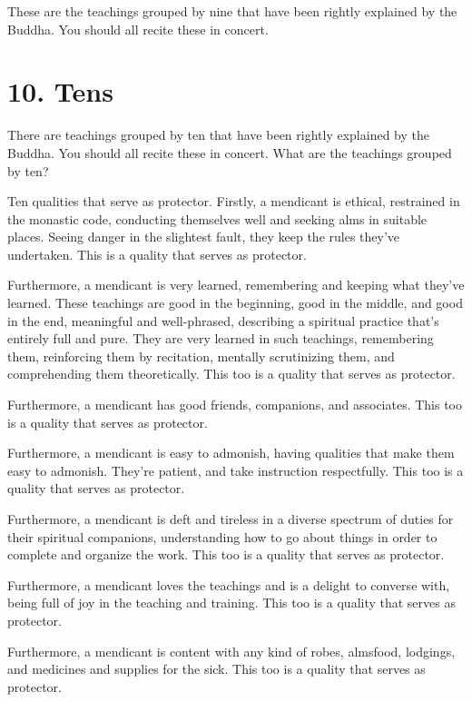 \documentclass[12pt,openany]{book}%
\begin{document}
These are the teachings grouped by nine that have been rightly explained by the Buddha. You should all recite these in concert. 

\section*{10. Tens }

There are teachings grouped by ten that have been rightly explained by the Buddha. You should all recite these in concert. What are the teachings grouped by ten? 

Ten qualities that serve as protector. Firstly, a mendicant is ethical, restrained in the monastic code, conducting themselves well and seeking alms in suitable places. Seeing danger in the slightest fault, they keep the rules they’ve undertaken. This is a quality that serves as protector. 

Furthermore, a mendicant is very learned, remembering and keeping what they’ve learned. These teachings are good in the beginning, good in the middle, and good in the end, meaningful and well-phrased, describing a spiritual practice that’s entirely full and pure. They are very learned in such teachings, remembering them, reinforcing them by recitation, mentally scrutinizing them, and comprehending them theoretically. This too is a quality that serves as protector. 

Furthermore, a mendicant has good friends, companions, and associates. This too is a quality that serves as protector. 

Furthermore, a mendicant is easy to admonish, having qualities that make them easy to admonish. They’re patient, and take instruction respectfully. This too is a quality that serves as protector. 

Furthermore, a mendicant is deft and tireless in a diverse spectrum of duties for their spiritual companions, understanding how to go about things in order to complete and organize the work. This too is a quality that serves as protector. 

Furthermore, a mendicant loves the teachings and is a delight to converse with, being full of joy in the teaching and training. This too is a quality that serves as protector. 

Furthermore, a mendicant is content with any kind of robes, almsfood, lodgings, and medicines and supplies for the sick. This too is a quality that serves as protector. 
\end{document}
